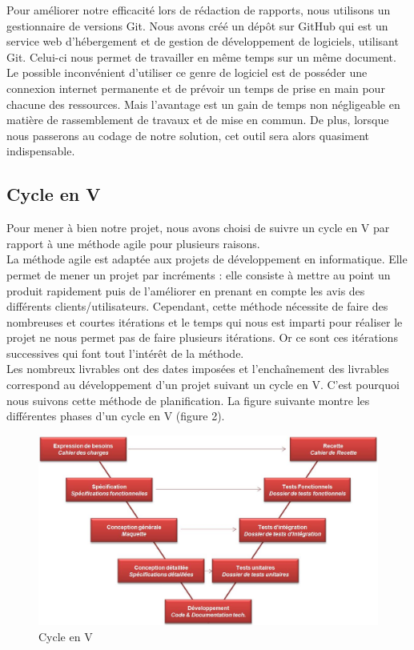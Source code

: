 \documentclass[a4paper]{article}
\begin{document}
	Pour améliorer notre efficacité lors de rédaction de rapports, nous utilisons un gestionnaire de versions Git. Nous avons créé un dépôt sur GitHub qui est un service web d'hébergement et de gestion de développement de logiciels, utilisant Git. Celui-ci nous permet de travailler en même temps sur un même document. Le possible inconvénient d'utiliser ce genre de logiciel est de posséder une connexion internet permanente et de prévoir un temps de prise en main pour chacune des ressources. Mais l'avantage est un gain de temps non négligeable en matière de rassemblement de travaux et de mise en commun. De plus, lorsque nous passerons au codage de notre solution, cet outil sera alors quasiment indispensable.

	\subsection{Cycle en V}
	
	Pour mener à bien notre projet, nous avons choisi de suivre un cycle en V par rapport à une méthode agile pour plusieurs raisons.\\
	
	La méthode agile est adaptée aux projets de développement en informatique. Elle permet de mener un projet par incréments : elle consiste à mettre au point un produit rapidement puis de l'améliorer en prenant en compte les avis des différents clients/utilisateurs. Cependant, cette méthode nécessite de faire des nombreuses et courtes itérations et le temps qui nous est imparti pour réaliser le projet ne nous permet pas de faire plusieurs itérations. Or ce sont ces itérations successives qui font tout l'intérêt de la méthode.\\
	
	Les nombreux livrables ont des dates imposées et l'enchaînement des livrables correspond au développement d'un projet suivant un cycle en V. C'est pourquoi nous suivons cette méthode de planification. La figure suivante montre les différentes phases d'un cycle en V (figure 2).\\
	
\begin{figure}[H]
\centering
\includegraphics[width=\textwidth]{Cycle_en_V.jpg}
\caption{Cycle en V}
\label{fig:cycleenv}
\end{figure}
	
\end{document}

